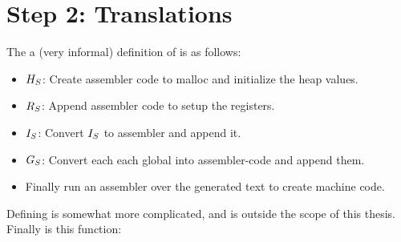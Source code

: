 \section{Step 2: Translations}

The a (very informal) definition of \simpleembed is as follows:

\begin{itemize}
\item ${H_S}$: Create assembler code to malloc and initialize the heap
  values.
\item ${R_S}$: Append assembler code to setup the registers.
\item ${I_S}$: Convert ${I_S}$ to assembler and append it.
\item ${G_S}$: Convert each each global into assembler-code and append them.
\item Finally run an assembler over the generated text to create machine code.
\end{itemize}

Defining \simpleembedp is somewhat more complicated, and is outside the scope
of this thesis. Finally \highembed is this function:

